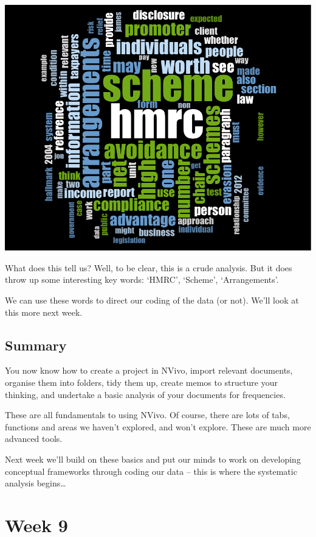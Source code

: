 \documentclass[]{book}
\theoremstyle{definition}
\theoremstyle{definition}
\theoremstyle{definition}
\theoremstyle{remark}
\begin{document}
\includegraphics{imgs/qual_30.png}

What does this tell us? Well, to be clear, this is a crude analysis. But
it does throw up some interesting key words: `HMRC', `Scheme',
`Arrangements'.

We can use these words to direct our coding of the data (or not). We'll
look at this more next week.

\hypertarget{summary-7}{%
\section{Summary}\label{summary-7}}

You now know how to create a project in NVivo, import relevant
documents, organise them into folders, tidy them up, create memos to
structure your thinking, and undertake a basic analysis of your
documents for frequencies.

These are all fundamentals to using NVivo. Of course, there are lots of
tabs, functions and areas we haven't explored, and won't explore. These
are much more advanced tools.

Next week we'll build on these basics and put our minds to work on
developing conceptual frameworks through coding our data -- this is
where the systematic analysis begins\ldots{}

\hypertarget{week9}{%
\chapter{Week 9}\label{week9}}
\end{document}
